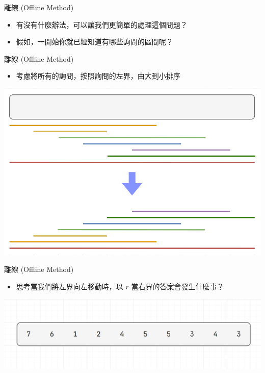 \documentclass[aspectratio=169]{beamer}
\begin{document}
    \begin{frame}{離線 (Offline Method)}
        \begin{itemize}
            \item 有沒有什麼辦法，可以讓我們更簡單的處理這個問題？
            \item 假如，一開始你就已經知道有哪些詢問的區間呢？
        \end{itemize}
    \end{frame}

    \begin{frame}{離線 (Offline Method)}
        \begin{itemize}
            \item 考慮將所有的詢問，按照詢問的左界，由大到小排序
        \end{itemize}
        \begin{center}
            \includegraphics[scale=0.3]{offline/sort_queries.png}
        \end{center}
    \end{frame}

    \begin{frame}{離線 (Offline Method)}
        \begin{itemize}
            \item 思考當我們將左界向左移動時，以 $r$ 當右界的答案會發生什麼事？
        \end{itemize}
        \begin{center}
            \includegraphics[scale=0.4]{offline/array.png}
        \end{center}
    \end{frame}
\end{document}
